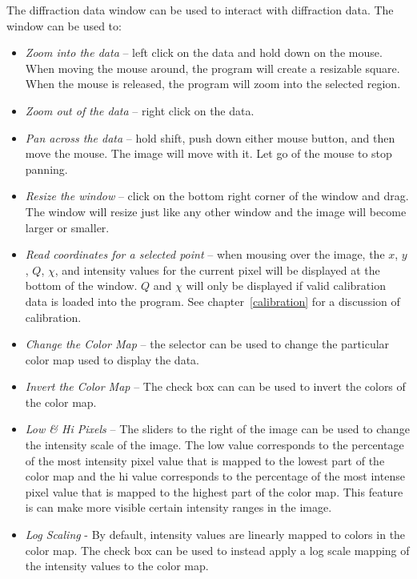The diffraction data window can be used to interact with 
diffraction data. The window can be used to:
\begin{itemize}
    \item {\em Zoom into the data} -- left click on the data and 
    hold down on the mouse. When moving the mouse around, the
    program will create a resizable square. When the mouse is released,
    the program will zoom into the selected region.
    \item {\em Zoom out of the data} -- right click on
    the data.
    \item {\em Pan across the data} -- hold shift, push down either mouse
    button, and then move the mouse. The image will move 
    with it. Let go of the mouse to stop panning.
    \item {\em Resize the window} -- click on the bottom right corner of
    the window and drag. The window will resize just like any
    other window and the image will become larger or smaller.  
    \item {\em Read coordinates for a selected point} -- when mousing
    over the image, the $x$, $y$, $Q$, $\chi$, and intensity
    values for the current pixel will be displayed at the bottom of the
    window. $Q$ and $\chi$ will only be displayed if valid calibration
    data is loaded into the program. See chapter~\ref{calibration} for
    a discussion of calibration.
    \item {\em Change the Color Map} -- the  selector 
    can be used to change the particular color map used to display the 
    data.
    \item {\em Invert the Color Map} -- The  check box can 
    can be used to invert the colors of the color map.
    \item {\em Low \& Hi Pixels} -- The sliders to the right of the 
    image can be used to change the intensity scale of the
    image. The low value corresponds to the percentage of
    the most intensity pixel value that is mapped to the lowest part of
    the color map and the hi value corresponds to the percentage of
    the most intense pixel value that is mapped to the highest 
    part of the color map.  This feature is can make more
    visible certain intensity ranges in the image.
    \item {\em Log Scaling} - By default, intensity values are linearly 
    mapped to colors in the color map. The  check box 
    can be used to instead apply a log scale mapping of the intensity 
    values to the color map.
\end{itemize}

